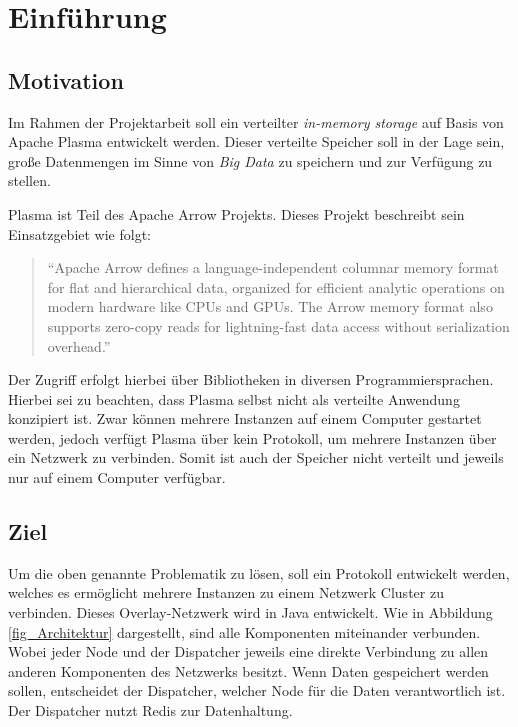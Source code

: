 \section{Einführung}\raggedbottom

\subsection{Motivation}
Im Rahmen der Projektarbeit soll ein verteilter \textit{in-memory storage} auf Basis von Apache Plasma entwickelt werden. Dieser verteilte Speicher soll in der Lage sein, große Datenmengen im Sinne von \textit{Big Data} zu speichern und zur Verfügung zu stellen.
 
Plasma ist Teil des Apache Arrow Projekts. Dieses Projekt beschreibt sein Einsatzgebiet wie folgt:
\begingroup
\addtolength\leftmargini{0.1in}
\begin{quote}
	``Apache Arrow defines a language-independent columnar memory format for flat and hierarchical data, organized for efficient analytic operations on modern hardware like CPUs and GPUs. The Arrow memory format also supports zero-copy reads for lightning-fast data access without serialization overhead.''\cite{Foundation}
\end{quote}
\endgroup
Der Zugriff erfolgt hierbei über Bibliotheken in diversen Programmiersprachen.
Hierbei sei zu beachten, dass Plasma selbst nicht als verteilte Anwendung konzipiert ist. Zwar können mehrere Instanzen auf einem Computer gestartet werden, jedoch verfügt Plasma über kein Protokoll, um mehrere Instanzen über ein Netzwerk zu verbinden. Somit ist auch der Speicher nicht verteilt und jeweils nur auf einem Computer verfügbar.

\subsection{Ziel}
Um die oben genannte Problematik zu lösen, soll ein Protokoll entwickelt werden, welches es ermöglicht mehrere Instanzen zu einem Netzwerk Cluster zu verbinden. Dieses Overlay-Netzwerk wird in Java entwickelt. Wie in Abbildung \ref{fig_Architektur} dargestellt, sind alle Komponenten miteinander verbunden. Wobei jeder Node und der Dispatcher jeweils eine direkte Verbindung zu allen anderen Komponenten des Netzwerks besitzt. Wenn Daten gespeichert werden sollen, entscheidet der Dispatcher, welcher Node für die Daten verantwortlich ist. Der Dispatcher nutzt Redis zur Datenhaltung.

